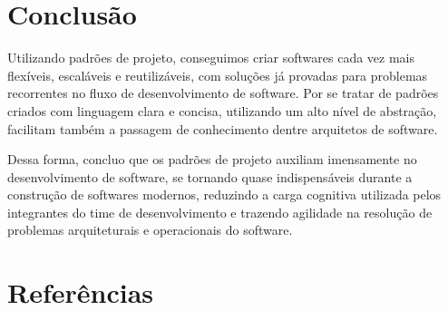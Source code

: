 \documentclass[12pt]{article}
\begin{document}
\section{Conclusão}

Utilizando padrões de projeto, conseguimos criar softwares cada 
vez mais flexíveis, escaláveis e reutilizáveis, com soluções já 
provadas para problemas recorrentes no fluxo de desenvolvimento 
de software. Por se tratar de padrões criados com linguagem clara 
e concisa, utilizando um alto nível de abstração, facilitam 
também a passagem de conhecimento dentre arquitetos de software.

Dessa forma, concluo que os padrões de projeto auxiliam imensamente 
no desenvolvimento de software, se tornando quase indispensáveis 
durante a construção de softwares modernos, reduzindo a carga 
cognitiva utilizada pelos integrantes do time de desenvolvimento 
e trazendo agilidade na resolução de problemas arquiteturais e 
operacionais do software.



\section{Referências}



\end{document}

